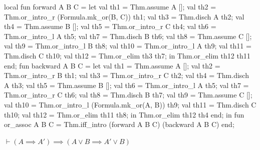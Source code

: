 \nwenddocs{}\endmoddef\nwstartdeflinemarkup{}\nwenddeflinemarkup
local
  fun forward A B C =
    let
      val th1 = Thm.assume A [];
      val th2 = Thm.or_intro_r (Formula.mk_or(B, C)) th1;
      val th3 = Thm.disch A th2;
      val th4 = Thm.assume B [];
      val th5 = Thm.or_intro_r C th4;
      val th6 = Thm.or_intro_l A th5;
      val th7 = Thm.disch B th6;
      val th8 = Thm.assume C [];
      val th9 = Thm.or_intro_l B th8;
      val th10 = Thm.or_intro_l A th9;
      val th11 = Thm.disch C th10;
      val th12 = Thm.or_elim th3 th7;
    in
      Thm.or_elim th12 th11
    end;
  fun backward A B C =
    let
      val th1 = Thm.assume A [];
      val th2 = Thm.or_intro_r B th1;
      val th3 = Thm.or_intro_r C th2;
      val th4 = Thm.disch A th3;
      val th5 = Thm.assume B [];
      val th6 = Thm.or_intro_l A th5;
      val th7 = Thm.or_intro_r C th6;
      val th8 = Thm.disch B th7;
      val th9 = Thm.assume C [];
      val th10 = Thm.or_intro_l (Formula.mk_or(A, B)) th9;
      val th11 = Thm.disch C th10;
      val th12 = Thm.or_elim th11 th8;
    in
      Thm.or_elim th12 th4
    end;
in
fun or_assoc A B C =
  Thm.iff_intro (forward A B C) (backward A B C)
end;
\eatline
{}\nwendcode{}\nwdocspar
\begin{node}
$\vdash(A\implies A')\implies(A\lor B\implies A'\lor B)$
\end{node}

